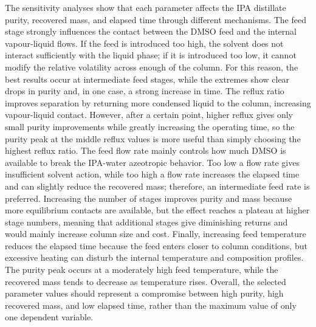 The sensitivity analyses show that each parameter affects the IPA
distillate purity, recovered mass, and elapsed time through different
mechanisms. The feed stage strongly influences the contact between the
DMSO feed and the internal vapour-liquid flows. If the feed is
introduced too high, the solvent does not interact sufficiently with the
liquid phase; if it is introduced too low, it cannot modify the relative
volatility across enough of the column. For this reason, the best
results occur at intermediate feed stages, while the extremes show clear
drops in purity and, in one case, a strong increase in time. The reflux
ratio improves separation by returning more condensed liquid to the
column, increasing vapour-liquid contact. However, after a certain
point, higher reflux gives only small purity improvements while greatly
increasing the operating time, so the purity peak at the middle reflux
values is more useful than simply choosing the highest reflux ratio. The
feed flow rate mainly controls how much DMSO is available to break the
IPA-water azeotropic behavior. Too low a flow rate gives insufficient
solvent action, while too high a flow rate increases the elapsed time
and can slightly reduce the recovered mass; therefore, an intermediate
feed rate is preferred. Increasing the number of stages improves purity
and mass because more equilibrium contacts are available, but the effect
reaches a plateau at higher stage numbers, meaning that additional
stages give diminishing returns and would mainly increase column size
and cost. Finally, increasing feed temperature reduces the elapsed time
because the feed enters closer to column conditions, but excessive
heating can disturb the internal temperature and composition profiles.
The purity peak occurs at a moderately high feed temperature, while the
recovered mass tends to decrease as temperature rises. Overall, the
selected parameter values should represent a compromise between high
purity, high recovered mass, and low elapsed time, rather than the
maximum value of only one dependent variable.

